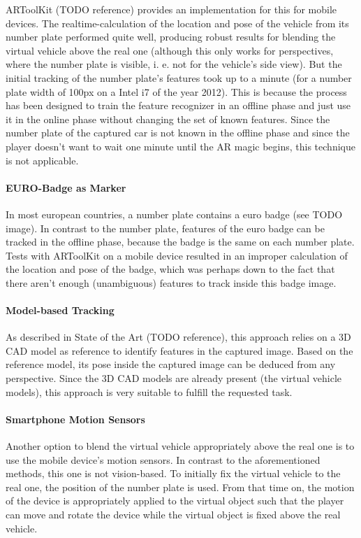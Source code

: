 ARToolKit (TODO reference) provides an implementation for this for mobile devices. The realtime-calculation of the location and pose of the vehicle from its number plate performed quite well, producing robust results for blending the virtual vehicle above the real one (although this only works for perspectives, where the number plate is visible, i. e. not for the vehicle’s side view). But the initial tracking of the number plate’s features took up to a minute (for a number plate width of 100px on a Intel i7 of the year 2012). This is because the process has been designed to train the feature recognizer in an offline phase and just use it in the online phase without changing the set of known features. Since the number plate of the captured car is not known in the offline phase and since the player doesn’t want to wait one minute until the AR magic begins, this technique is not applicable.

\paragraph{EURO-Badge as Marker}
In most european countries, a number plate contains a euro badge (see TODO image). In contrast to the number plate, features of the euro badge can be tracked in the offline phase, because the badge is the same on each number plate.
Tests with ARToolKit on a mobile device resulted in an improper calculation of the location and pose of the badge, which was perhaps down to the fact that there aren’t enough (unambiguous) features to track inside this badge image.

\paragraph{Model-based Tracking}
As described in State of the Art (TODO reference), this approach relies on a 3D CAD model as reference to identify features in the captured image. Based on the reference model, its pose inside the captured image can be deduced from any perspective. Since the 3D CAD models are already present (the virtual vehicle models), this approach is very suitable to fulfill the requested task.

\paragraph{Smartphone Motion Sensors}
Another option to blend the virtual vehicle appropriately above the real one is to use the mobile device’s motion sensors. In contrast to the aforementioned methods, this one is not vision-based. To initially fix the virtual vehicle to the real one, the position of the number plate is used. From that time on, the motion of the device is appropriately applied to the virtual object such that the player can move and rotate the device while the virtual object is fixed above the real vehicle.

